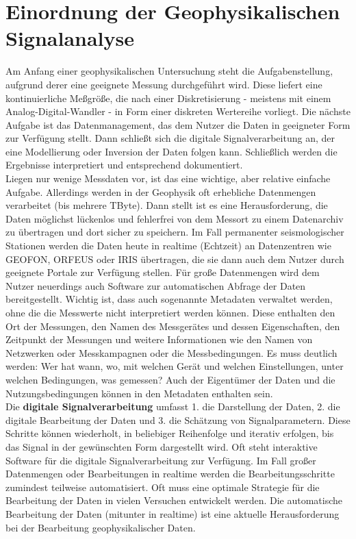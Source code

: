 \section{Einordnung der Geophysikalischen Signalanalyse}
Am Anfang einer geophysikalischen Untersuchung steht die Aufgabenstellung, aufgrund derer eine geeignete Messung durchgeführt wird. Diese liefert eine kontinuierliche Meßgröße, die nach einer Diskretisierung - meistens mit einem Analog-Digital-Wandler - in Form einer diskreten Wertereihe vorliegt. Die nächste Aufgabe ist das Datenmanagement, das dem Nutzer die Daten in geeigneter Form zur Verfügung stellt. Dann schließt sich die digitale Signalverarbeitung an, der eine Modellierung oder Inversion der Daten folgen kann. Schließlich werden die Ergebnisse interpretiert und entsprechend dokumentiert.\\

Liegen nur wenige Messdaten vor, ist das eine wichtige, aber relative einfache Aufgabe. Allerdings werden in der Geophysik oft erhebliche Datenmengen verarbeitet (bis mehrere TByte). Dann stellt ist es eine Herausforderung, die Daten möglichst lückenlos und fehlerfrei von dem Messort zu einem Datenarchiv zu übertragen und dort sicher zu speichern. Im Fall permanenter seismologischer Stationen werden die Daten heute in realtime (Echtzeit) an Datenzentren wie GEOFON, ORFEUS oder IRIS übertragen, die sie dann auch dem Nutzer durch geeignete Portale zur Verfügung stellen. Für große Datenmengen wird dem Nutzer neuerdings auch Software zur automatischen Abfrage der Daten bereitgestellt. Wichtig ist, dass auch sogenannte Metadaten verwaltet werden, ohne die die Messwerte nicht interpretiert werden können. Diese enthalten den Ort der Messungen, den Namen des Messgerätes und dessen Eigenschaften, den Zeitpunkt der Messungen und weitere Informationen wie den Namen von Netzwerken oder Messkampagnen oder die Messbedingungen. Es muss deutlich werden: Wer hat wann, wo, mit welchen Gerät und welchen Einstellungen, unter welchen Bedingungen, was gemessen? Auch der Eigentümer der Daten und die Nutzungsbedingungen können in den Metadaten enthalten sein.\\

Die {\bf digitale Signalverarbeitung} umfasst 1. die Darstellung der Daten, 2. die digitale Bearbeitung der Daten und 3. die Schätzung von Signalparametern. Diese Schritte können wiederholt, in beliebiger Reihenfolge und iterativ erfolgen, bis das Signal in der gewünschten Form dargestellt wird. Oft steht interaktive Software für die digitale Signalverarbeitung zur Verfügung. Im Fall großer Datenmengen oder Bearbeitungen in realtime werden die Bearbeitungsschritte zumindest teilweise automatisiert. Oft muss eine optimale Strategie für die Bearbeitung der Daten in vielen Versuchen entwickelt werden. Die automatische Bearbeitung der Daten (mitunter in realtime) ist eine aktuelle Herausforderung bei der Bearbeitung geophysikalischer Daten.

